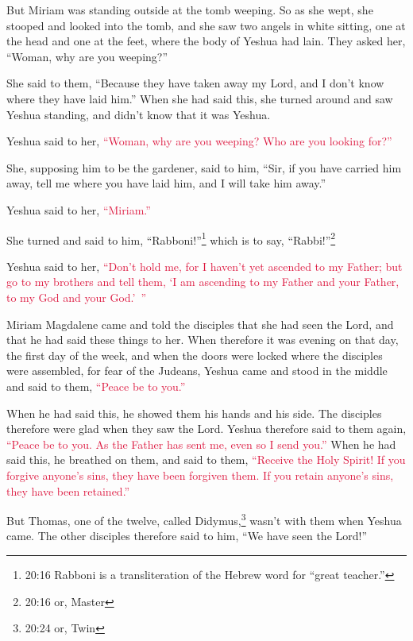 \myverse{}But Miriam was standing outside at the tomb weeping. So as she
wept, she stooped and looked into the tomb,
\myverse{}and she saw two angels in white sitting, one at the head and one at the feet,
where the body of Yeshua had lain.
\myverse{}They asked her, “Woman, why are you weeping?”

She said to them, “Because they have taken away my Lord, and I don’t know where they have
laid him.”
\myverse{}When she had said this, she turned around and saw Yeshua standing, and didn’t
know that it was Yeshua.

\myverse{}Yeshua said to her,
\textcolor{crimson}{“Woman, why are you weeping? Who are you looking for?”}

She, supposing him to be the gardener, said to him, “Sir, if you have carried him away, tell
me where you have laid him, and I will take him away.”

\myverse{}Yeshua said to her,
\textcolor{crimson}{“Miriam.”}

She turned and said to him, “Rabboni!”\footnote{20:16 Rabboni is a transliteration of the Hebrew word for “great teacher.”} which is to say,
“Rabbi!”\footnote{20:16 or, Master}

\myverse{}Yeshua said to her,
\textcolor{crimson}{“Don’t hold me, for I haven’t yet ascended to my Father; but go to my brothers and tell them, ‘I am
	ascending to my Father and your Father, to my God and your God.’ ”}

\myverse{}Miriam Magdalene came and told the disciples that she had seen
the Lord, and that he had said these things to her.
\myverse{}When therefore it was evening on that day, the first day of the week, and
when the doors were locked where the disciples were assembled, for fear of the Judeans, Yeshua came and
stood in the middle and said to them,
\textcolor{crimson}{“Peace be to you.”}

\myverse{}When he had said this, he showed them his hands and his side.
The disciples therefore were glad when they saw the Lord.
\myverse{}Yeshua therefore said to them again,
\textcolor{crimson}{“Peace be to you. As the Father has sent me, even so I send you.”} \myverse{}When he had said this, he breathed on them, and said to them, \textcolor{crimson}{“Receive the Holy Spirit!} \myverse{}\textcolor{crimson}{If you forgive anyone’s sins, they have been forgiven them. If you retain anyone’s sins, they have been retained.”}

\myverse{}But Thomas, one of the twelve, called Didymus,\footnote{20:24 or, Twin} wasn’t with them when Yeshua came.
\myverse{}The other disciples therefore said to him, “We have seen the Lord!”

